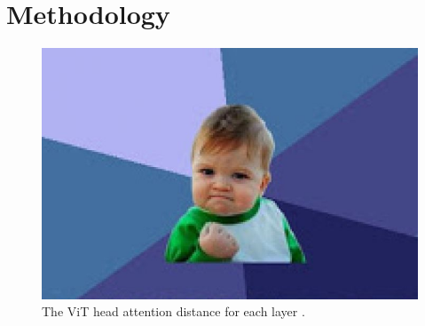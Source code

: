 
\chapter{Methodology}

\begin{figure}[h]
    \centering
    \includegraphics[width=0.6\linewidth]{figures/timthumb.jpeg}
    \caption{The ViT head attention distance for each layer \cite{eqa_das2018embodied}.}
    \label{vit_attention}
\end{figure}